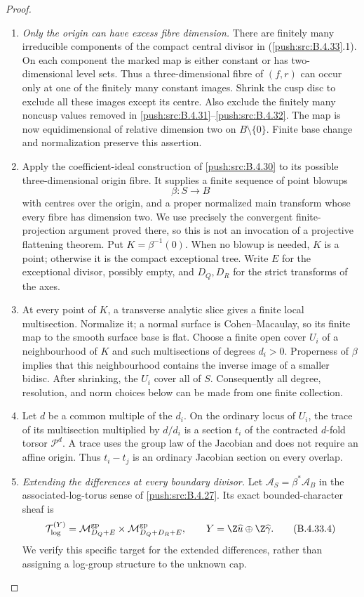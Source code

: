 \begin{proof}
\begin{enumerate}[label=\arabic*.,leftmargin=*]
\item \emph{Only the origin can have excess fibre dimension.}
There are finitely many irreducible components
of the compact central divisor in (\ref{push:src:B.4.33}.1).
On each component the marked map is either
constant or has two-dimensional level sets.
Thus a three-dimensional fibre of $(f,r)$
can occur only at one of the finitely many
constant images. Shrink the cusp disc to
exclude all these images except its centre.
Also exclude the finitely many noncusp values
removed in \ref{push:src:B.4.31}--\ref{push:src:B.4.32}. The map is now
equidimensional of relative dimension two
on $B\setminus\{0\}$. Finite base change
and normalization preserve this assertion.

\item Apply the coefficient-ideal construction of
\ref{push:src:B.4.30} to its possible three-dimensional
origin fibre. It supplies a finite sequence
of point blowups
\[
 \beta:S\longrightarrow B
 \tag{B.4.33.3}
\]
with centres over the origin, and a proper
normalized main transform whose every fibre
has dimension two. We use precisely the
convergent finite-projection argument proved
there, so this is not an invocation of a
projective flattening theorem. Put
$K=\beta^{-1}(0)$. When no blowup is needed,
$K$ is a point; otherwise it is the compact
exceptional tree. Write $E$ for the exceptional
divisor, possibly empty, and $D_Q,D_R$ for
the strict transforms of the axes.

\item At every point of $K$, a transverse analytic
slice gives a finite local multisection.
Normalize it; a normal surface is
Cohen--Macaulay, so its finite map to the
smooth surface base is flat. Choose a finite
open cover $U_i$ of a neighbourhood of $K$
and such multisections of degrees $d_i>0$.
Properness of $\beta$ implies that this
neighbourhood contains the inverse image
of a smaller bidisc. After shrinking, the
$U_i$ cover all of $S$. Consequently all
degree, resolution, and norm choices below
can be made from one finite collection.

\item Let $d$ be a common multiple of the $d_i$.
On the ordinary locus of $U_i$, the trace
of its multisection multiplied by $d/d_i$
is a section $t_i$ of the contracted
$d$-fold torsor $\mathscr P^d$. A trace
uses the group law of the Jacobian and
does not require an affine origin. Thus
$t_i-t_j$ is an ordinary Jacobian section
on every overlap.

\item \emph{Extending the differences at every boundary divisor.}
Let $\mathcal A_S=\beta^*\mathcal A_B$ in
the associated-log-torus sense of \ref{push:src:B.4.27}.
Its exact bounded-character sheaf is
\[
 \mathcal T_{\log}^{(Y)}
  =\mathcal M_{D_Q+E}^{\rm gp}
        \times\mathcal M_{D_Q+D_R+E}^{\rm gp},
 \qquad Y=\Z\widehat u\oplus\Z\widehat\gamma.
 \tag{B.4.33.4}
\]
We verify this specific target for the
extended differences, rather than assigning
a log-group structure to the unknown cap.


\end{enumerate}
\end{proof}
